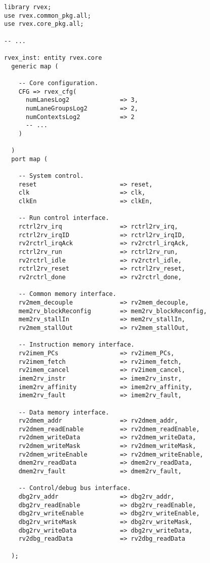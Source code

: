 \documentclass[10pt]{article}
\begin{document}
\begin{lstlisting}[numbers=none]
library rvex;
use rvex.common_pkg.all;
use rvex.core_pkg.all;

-- ...

rvex_inst: entity rvex.core
  generic map (
    
    -- Core configuration.
    CFG => rvex_cfg(
      numLanesLog2              => 3,
      numLaneGroupsLog2         => 2,
      numContextsLog2           => 2
      -- ...
    )
    
  )
  port map (
    
    -- System control.
    reset                       => reset,
    clk                         => clk,
    clkEn                       => clkEn,
    
    -- Run control interface.
    rctrl2rv_irq                => rctrl2rv_irq,
    rctrl2rv_irqID              => rctrl2rv_irqID,
    rv2rctrl_irqAck             => rv2rctrl_irqAck,
    rctrl2rv_run                => rctrl2rv_run,
    rv2rctrl_idle               => rv2rctrl_idle,
    rctrl2rv_reset              => rctrl2rv_reset,
    rv2rctrl_done               => rv2rctrl_done,
    
    -- Common memory interface.
    rv2mem_decouple             => rv2mem_decouple,
    mem2rv_blockReconfig        => mem2rv_blockReconfig,
    mem2rv_stallIn              => mem2rv_stallIn,
    rv2mem_stallOut             => rv2mem_stallOut,
    
    -- Instruction memory interface.
    rv2imem_PCs                 => rv2imem_PCs,
    rv2imem_fetch               => rv2imem_fetch,
    rv2imem_cancel              => rv2imem_cancel,
    imem2rv_instr               => imem2rv_instr,
    imem2rv_affinity            => imem2rv_affinity,
    imem2rv_fault               => imem2rv_fault,
    
    -- Data memory interface.
    rv2dmem_addr                => rv2dmem_addr,
    rv2dmem_readEnable          => rv2dmem_readEnable,
    rv2dmem_writeData           => rv2dmem_writeData,
    rv2dmem_writeMask           => rv2dmem_writeMask,
    rv2dmem_writeEnable         => rv2dmem_writeEnable,
    dmem2rv_readData            => dmem2rv_readData,
    dmem2rv_fault               => dmem2rv_fault,
    
    -- Control/debug bus interface.
    dbg2rv_addr                 => dbg2rv_addr,
    dbg2rv_readEnable           => dbg2rv_readEnable,
    dbg2rv_writeEnable          => dbg2rv_writeEnable,
    dbg2rv_writeMask            => dbg2rv_writeMask,
    dbg2rv_writeData            => dbg2rv_writeData,
    rv2dbg_readData             => rv2dbg_readData
    
  );

\end{lstlisting}
\end{document}

